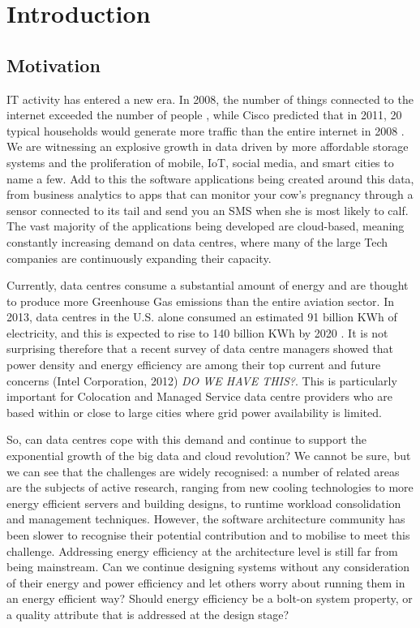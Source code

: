 \chapter{Introduction}

\section{Motivation}

IT activity has entered a new era. In 2008, the number of things connected to the internet exceeded the number of people \cite{evans2008-iotinfo}, while Cisco predicted that in 2011, 20 typical households would generate more traffic than the entire internet in 2008 \cite{evans2008-iotinfo}. We are witnessing an explosive growth in data driven by more affordable storage systems and the proliferation of mobile, IoT, social media, and smart cities to name a few. Add to this the software applications being created around this data, from business analytics to apps that can monitor your cow's pregnancy through a sensor connected to its tail and send you an SMS when she is most likely to calf. The vast majority of the applications being developed are cloud-based, meaning constantly increasing demand on data centres, where many of the large Tech companies are continuously expanding their capacity. 

Currently, data centres consume a substantial amount of energy and are thought to produce more Greenhouse Gas emissions than the entire aviation sector. In 2013, data centres in the U.S. alone consumed an estimated 91 billion KWh of electricity, and this is expected to rise to 140 billion KWh by 2020 \cite{delforge2014-datacentreenergy}. It is not surprising therefore that a recent survey of data centre managers showed that power density and energy efficiency are among their top current and future concerns (Intel Corporation, 2012) \textit{DO WE HAVE THIS?}. This is particularly important for Colocation and Managed Service data centre providers who are based within or close to large cities where grid power availability is limited. 

So, can data centres cope with this demand and continue to support the exponential growth of the big data and cloud revolution? We cannot be sure, but we can see that the challenges are widely recognised: a number of related areas are the subjects of active research, ranging from new cooling technologies to more energy efficient servers and building designs, to runtime workload consolidation and management techniques. However, the software architecture community has been slower to recognise their potential contribution and to mobilise to meet this challenge. Addressing energy efficiency at the architecture level is still far from being mainstream. Can we continue designing systems without any consideration of their energy and power efficiency and let others worry about running them in an energy efficient way? Should energy efficiency be a bolt-on system property, or a quality attribute that is addressed at the design stage?


